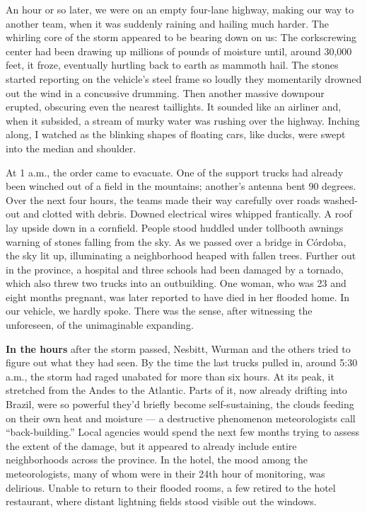 An hour or so later, we were on an empty four-lane highway, making our
way to another team, when it was suddenly raining and hailing much
harder. The whirling core of the storm appeared to be bearing down on
us: The corkscrewing center had been drawing up millions of pounds of
moisture until, around 30,000 feet, it froze, eventually hurtling back
to earth as mammoth hail. The stones started reporting on the vehicle's
steel frame so loudly they momentarily drowned out the wind in a
concussive drumming. Then another massive downpour erupted, obscuring
even the nearest taillights. It sounded like an airliner and, when it
subsided, a stream of murky water was rushing over the highway. Inching
along, I watched as the blinking shapes of floating cars, like ducks,
were swept into the median and shoulder.

At 1 a.m., the order came to evacuate. One of the support trucks had
already been winched out of a field in the mountains; another's antenna
bent 90 degrees. Over the next four hours, the teams made their way
carefully over roads washed-out and clotted with debris. Downed
electrical wires whipped frantically. A roof lay upside down in a
cornfield. People stood huddled under tollbooth awnings warning of
stones falling from the sky. As we passed over a bridge in Córdoba, the
sky lit up, illuminating a neighborhood heaped with fallen trees.
Further out in the province, a hospital and three schools had been
damaged by a tornado, which also threw two trucks into an outbuilding.
One woman, who was 23 and eight months pregnant, was later reported to
have died in her flooded home. In our vehicle, we hardly spoke. There
was the sense, after witnessing the unforeseen, of the unimaginable
expanding.

\textbf{In the hours} after the storm passed, Nesbitt, Wurman and the
others tried to figure out what they had seen. By the time the last
trucks pulled in, around 5:30 a.m., the storm had raged unabated for
more than six hours. At its peak, it stretched from the Andes to the
Atlantic. Parts of it, now already drifting into Brazil, were so
powerful they'd briefly become self-sustaining, the clouds feeding on
their own heat and moisture --- a destructive phenomenon meteorologists
call ``back-building.'' Local agencies would spend the next few months
trying to assess the extent of the damage, but it appeared to already
include entire neighborhoods across the province. In the hotel, the mood
among the meteorologists, many of whom were in their 24th hour of
monitoring, was delirious. Unable to return to their flooded rooms, a
few retired to the hotel restaurant, where distant lightning fields
stood visible out the windows.

